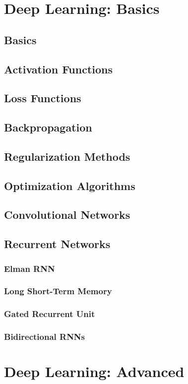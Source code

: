 \documentclass[twoside,twocolumn]{article}
\begin{document}
\section{Deep Learning: Basics}
\subsection{Basics}
\subsection{Activation Functions}
\subsection{Loss Functions}
\subsection{Backpropagation}
\subsection{Regularization Methods}
\subsection{Optimization Algorithms}
\subsection{Convolutional Networks}
\subsection{Recurrent Networks}
\subsubsection{Elman RNN}
\subsubsection{Long Short-Term Memory}
\subsubsection{Gated Recurrent Unit}
\subsubsection{Bidirectional RNNs}
\section{Deep Learning: Advanced}
\end{document}
